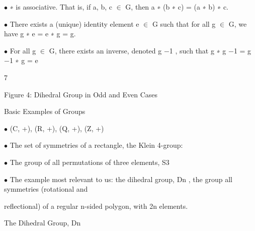 \documentclass[a4paper,portrait,12pt]{article}
\begin{document}
\begin{flushleft}
$\bullet$ ∗ is associative. That is, if a, b, c $\in$ G, then a ∗ (b ∗ c) = (a ∗ b) ∗ c.
\end{flushleft}


\begin{flushleft}
$\bullet$ There exists a (unique) identity element e $\in$ G such that for all g $\in$ G, we have g ∗ e = e ∗ g = g.
\end{flushleft}


\begin{flushleft}
$\bullet$ For all g $\in$ G, there exists an inverse, denoted g $-$1 , such that g ∗ g $-$1 = g $-$1 ∗ g = e
\end{flushleft}


7





\begin{flushleft}
\newpage
Figure 4: Dihedral Group in Odd and Even Cases
\end{flushleft}





\begin{flushleft}
Basic Examples of Groups
\end{flushleft}


\begin{flushleft}
$\bullet$ (C, +), (R, +), (Q, +), (Z, +)
\end{flushleft}


\begin{flushleft}
$\bullet$ The set of symmetries of a rectangle, the Klein 4-group:
\end{flushleft}


\begin{flushleft}
$\bullet$ The group of all permutations of three elements, S3
\end{flushleft}


\begin{flushleft}
$\bullet$ The example most relevant to us: the dihedral group, Dn , the group all symmetries (rotational and
\end{flushleft}


\begin{flushleft}
reflectional) of a regular n-sided polygon, with 2n elements.
\end{flushleft}





\begin{flushleft}
The Dihedral Group, Dn
\end{flushleft}
\end{document}
